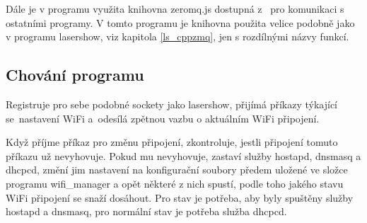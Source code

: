 Dále je v programu využita knihovna zeromq.js dostupná z~\cite{zeromq.js} pro komunikaci s ostatními programy. V tomto programu je knihovna použita velice podobně jako v programu lasershow, viz kapitola \ref{ls_cppzmq}, jen s rozdílnými názvy funkcí.

\subsection{Chování programu}

Registruje pro sebe podobné sockety jako lasershow, přijímá příkazy týkající se~nastavení WiFi a~odesílá zpětnou vazbu o aktuálním WiFi připojení.

Když příjme příkaz pro změnu připojení, zkontroluje, jestli připojení tomuto příkazu už nevyhovuje. Pokud mu nevyhovuje, zastaví služby hostapd, dnsmasq a dhcpcd, změní jim nastavení na konfigurační soubory předem uložené ve složce programu wifi_manager a opět některé z nich spustí, podle toho jakého stavu WiFi připojení se snaží dosáhout. Pro  stav je potřeba, aby byly spuštěny služby hostapd a dnsmasq, pro normální  stav je potřeba služba dhcpcd.

